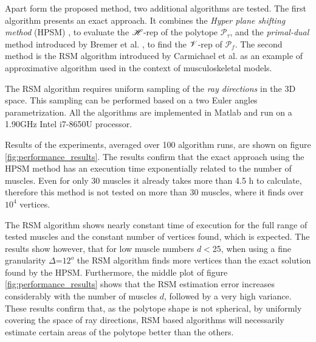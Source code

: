 Apart form the proposed method, two additional algorithms are tested. The first algorithm presents an exact approach. It combines the \textit{Hyper plane shifting method} (HPSM) \cite{hyper_psm}, to evaluate the $\mathscr{H}$-rep of the polytope $\mathcal{P}_\tau$, and the \textit{primal-dual} method introduced by Bremer et al. \cite{bremner_fukuda_marzetta_1998}, to find the $\mathscr{V}$-rep of $\mathcal{P}_f$. The second method is the RSM algorithm introduced by Carmichael et al. \cite{carmichael2011Towards} as an example of approximative algorithm used in the context of musculoskeletal models.

The RSM algorithm \cite{carmichael2011Towards} requires uniform sampling of the \textit{ray directions} in the 3D space. This sampling can be performed based on a two Euler angles parametrization.  All the algorithms are implemented in Matlab and run on a 1.90GHz Intel i7-8650U processor.

Results of the experiments, averaged over 100 algorithm runs, are shown on figure \ref{fig:performance_results}. The results confirm that the exact approach using the HPSM method has an execution time exponentially related to the number of muscles. Even for only 30 muscles it already takes more than 4.5 h to calculate, therefore this method is not tested on more than 30 muscles, where it finds over $10^4$ vertices.  

The RSM algorithm shows nearly constant time of execution for the full range of tested muscles and the constant number of vertices found, which is expected. The results show however, that for low muscle numbers $d\!<$25, when using a fine granularity $\Delta$=$12^o$ the RSM algorithm finds more vertices than the exact solution found by the HPSM. Furthermore, the middle plot of figure \ref{fig:performance_results} shows that the RSM estimation error increases considerably with the number of muscles $d$, followed by a very
high variance. These results confirm that, as the polytope shape is not spherical, by uniformly covering the space of ray directions, RSM based algorithms will necessarily estimate certain areas of the polytope better than the others.

